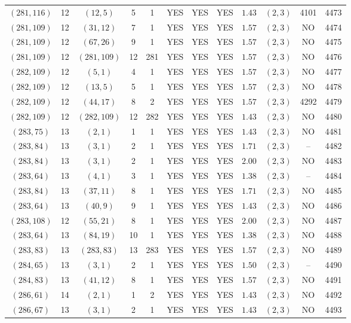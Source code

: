 \begin{longtable}{|c|c|c|c|c|c|c|c|c|c|c|c|}
$(281,116)$ & 12 & $(12,5)$ & 5 & 1 & YES & YES & YES & $1.43$ & $(2,3)$ & 4101 & 4473\\
$(281,109)$ & 12 & $(31,12)$ & 7 & 1 & YES & YES & YES & $1.57$ & $(2,3)$ & NO & 4474\\
$(281,109)$ & 12 & $(67,26)$ & 9 & 1 & YES & YES & YES & $1.57$ & $(2,3)$ & NO & 4475\\
$(281,109)$ & 12 & $(281,109)$ & 12 & 281 & YES & YES & YES & $1.57$ & $(2,3)$ & NO & 4476\\
$(282,109)$ & 12 & $(5,1)$ & 4 & 1 & YES & YES & YES & $1.57$ & $(2,3)$ & NO & 4477\\
$(282,109)$ & 12 & $(13,5)$ & 5 & 1 & YES & YES & YES & $1.57$ & $(2,3)$ & NO & 4478\\
$(282,109)$ & 12 & $(44,17)$ & 8 & 2 & YES & YES & YES & $1.57$ & $(2,3)$ & 4292 & 4479\\
$(282,109)$ & 12 & $(282,109)$ & 12 & 282 & YES & YES & YES & $1.43$ & $(2,3)$ & NO & 4480\\
$(283,75)$ & 13 & $(2,1)$ & 1 & 1 & YES & YES & YES & $1.43$ & $(2,3)$ & NO & 4481\\
$(283,84)$ & 13 & $(3,1)$ & 2 & 1 & YES & YES & YES & $1.71$ & $(2,3)$ & -- & 4482\\
$(283,84)$ & 13 & $(3,1)$ & 2 & 1 & YES & YES & YES & $2.00$ & $(2,3)$ & NO & 4483\\
$(283,64)$ & 13 & $(4,1)$ & 3 & 1 & YES & YES & YES & $1.38$ & $(2,3)$ & -- & 4484\\
$(283,84)$ & 13 & $(37,11)$ & 8 & 1 & YES & YES & YES & $1.71$ & $(2,3)$ & NO & 4485\\
$(283,64)$ & 13 & $(40,9)$ & 9 & 1 & YES & YES & YES & $1.43$ & $(2,3)$ & NO & 4486\\
$(283,108)$ & 12 & $(55,21)$ & 8 & 1 & YES & YES & YES & $2.00$ & $(2,3)$ & NO & 4487\\
$(283,64)$ & 13 & $(84,19)$ & 10 & 1 & YES & YES & YES & $1.38$ & $(2,3)$ & NO & 4488\\
$(283,83)$ & 13 & $(283,83)$ & 13 & 283 & YES & YES & YES & $1.57$ & $(2,3)$ & NO & 4489\\
$(284,65)$ & 13 & $(3,1)$ & 2 & 1 & YES & YES & YES & $1.50$ & $(2,3)$ & -- & 4490\\
$(284,83)$ & 13 & $(41,12)$ & 8 & 1 & YES & YES & YES & $1.57$ & $(2,3)$ & NO & 4491\\
$(286,61)$ & 14 & $(2,1)$ & 1 & 2 & YES & YES & YES & $1.43$ & $(2,3)$ & NO & 4492\\
$(286,67)$ & 13 & $(3,1)$ & 2 & 1 & YES & YES & YES & $1.43$ & $(2,3)$ & NO & 4493\\

\end{longtable}

